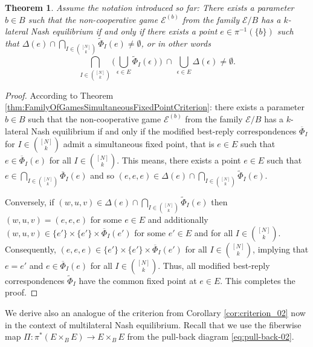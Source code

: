 \documentclass[a4paper,11pt,reqno,english]{amsart}
\theoremstyle{plain}
\newtheorem{theorem}{Theorem}[section]
\theoremstyle{definition}
\newcommand{\Ecal}{\mathcal{E}}
\begin{document}
\begin{theorem}\label{thm:criterion_011}
	Assume the notation introduced so far: There exists a parameter $b\in B$ such that the non-cooperative game $\Ecal^{(b)}$ from the family $\Ecal/B$ has a $k$-lateral Nash equilibrium if and only if there exists a point $e\in \pi^{-1}(\{b\})$ such that $\Delta(e)\cap \bigcap_{I\in\binom{[N]}{k}}\widetilde{\Phi}_I(e)\neq\emptyset$, or in other words
	\begin{displaymath}
		\bigcap_{I\in\binom{[N]}{k}}\big(\bigcup_{\epsilon\in E}\widetilde{\Phi}_I (\epsilon)\big) \ \cap \ \bigcup_{\epsilon\in E} \Delta(\epsilon)\neq \emptyset.
	\end{displaymath}
\end{theorem}
\begin{proof}
	According to Theorem \ref{thm:FamilyOfGamesSimultaneousFixedPointCriterion}: there exists a parameter $b\in B$ such that the non-cooperative game $\Ecal^{(b)}$ from the family $\Ecal/B$ has a $k$-lateral Nash equilibrium if and only if the modified best-reply correspondences $\overline{\Phi}_I$ for $I\in\binom{[N]}{k}$ admit a simultaneous fixed point, that is $e\in E$ such that $e\in\overline{\Phi}_I(e)$ for all $I\in\binom{[N]}{k}$.
	This means, there exists a point $e\in E$ such that $e\in \bigcap_{I\in\binom{[N]}{k}}\overline{\Phi}_I(e)$ and so $(e,e,e)\in \Delta(e)\cap \bigcap_{I\in\binom{[N]}{k}}\widetilde{\Phi}_I(e)$.

	\smallskip\noindent
	Conversely, if $(w,u,v)\in \Delta(e)\cap \bigcap_{I\in\binom{[N]}{k}}\widetilde{\Phi}_I(e)$ then $(w,u,v)=(e,e,e)$ for some $e\in E$ and additionally  $(w,u,v)\in   \{e'\}\times\{e'\}\times  \overline{\Phi}_I(e')$ for some $e'\in E$ and for all  $I\in\binom{[N]}{k}$.
	Consequently, $(e,e,e)\in \{e'\}\times\{e'\}\times   \overline{\Phi}_I(e')$ for all  $I\in\binom{[N]}{k}$, implying that $e=e'$ and $e\in  \overline{\Phi}_I(e)$ for all  $I\in\binom{[N]}{k}$.
	Thus, all modified best-reply correspondences $\widetilde{\Phi}_I$  have the common fixed point at $e\in E$.
	This completes the proof.
\end{proof}


\medskip
We  derive also an analogue of the criterion from Corollary \ref{cor:criterion_02} now in the context of multilateral Nash equilibrium.
Recall that we use the fiberwise map  $\Pi\colon \pi^*(E\times_B E)\longrightarrow E\times_B E$ from the pull-back diagram \eqref{eq:pull-back-02}.
\end{document}
